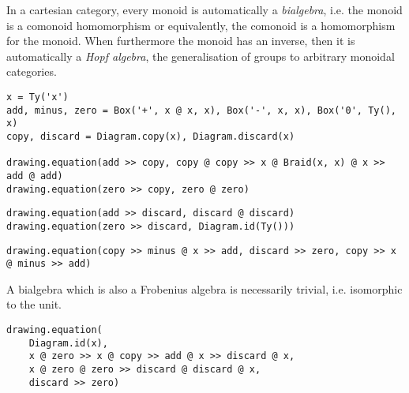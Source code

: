 \begin{example}
In a cartesian category, every monoid is automatically a \emph{bialgebra}, i.e. the monoid is a comonoid homomorphism or equivalently, the comonoid is a homomorphism for the monoid.
When furthermore the monoid has an inverse, then it is automatically a \emph{Hopf algebra}, the generalisation of groups to arbitrary monoidal categories.

\begin{verbatim}
x = Ty('x')
add, minus, zero = Box('+', x @ x, x), Box('-', x, x), Box('0', Ty(), x)
copy, discard = Diagram.copy(x), Diagram.discard(x)

drawing.equation(add >> copy, copy @ copy >> x @ Braid(x, x) @ x >> add @ add)
drawing.equation(zero >> copy, zero @ zero)
\end{verbatim}
\begin{center}
\hfill
{}
\end{center}
\begin{verbatim}
drawing.equation(add >> discard, discard @ discard)
drawing.equation(zero >> discard, Diagram.id(Ty()))
\end{verbatim}
\begin{center}
\hfill
{}
\end{center}
\begin{verbatim}
drawing.equation(copy >> minus @ x >> add, discard >> zero, copy >> x @ minus >> add)
\end{verbatim}

A bialgebra which is also a Frobenius algebra is necessarily trivial, i.e. isomorphic to the unit.

\begin{verbatim}
drawing.equation(
    Diagram.id(x),
    x @ zero >> x @ copy >> add @ x >> discard @ x,
    x @ zero @ zero >> discard @ discard @ x,
    discard >> zero)
\end{verbatim}

\end{example}

